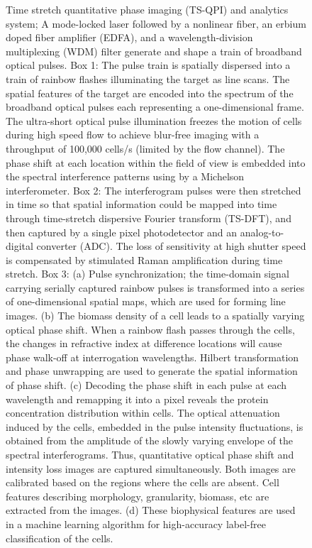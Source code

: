 \documentclass[aps,pra,reprint,superscriptaddress]{revtex4-1}
\begin{document}
\begin{figure}
\caption{\label{fig:Setup} Time stretch quantitative phase imaging (TS-QPI) and analytics system; A mode-locked laser followed by a nonlinear fiber, an erbium doped fiber amplifier (EDFA), and a wavelength-division multiplexing (WDM) filter generate and shape a train of broadband optical pulses. Box 1: The pulse train is spatially dispersed into a train of rainbow flashes illuminating the target as line scans. The spatial features of the target are encoded into the spectrum of the broadband optical pulses each representing a one-dimensional frame. The ultra-short optical pulse illumination freezes the motion of cells during high speed flow to achieve blur-free imaging with a throughput of 100,000 cells/s (limited by the flow channel). The phase shift at each location within the field of view is embedded into the spectral interference patterns using by a Michelson interferometer. Box 2: The interferogram pulses were then stretched in time so that spatial information could be mapped into time through time-stretch dispersive Fourier transform (TS-DFT), and then captured by a single pixel photodetector and an analog-to-digital converter (ADC). The loss of sensitivity at high shutter speed is compensated by stimulated Raman amplification during time stretch. Box 3: (a) Pulse synchronization; the time-domain signal carrying serially captured rainbow pulses is transformed into a series of one-dimensional spatial maps, which are used for forming line images. (b) The biomass density of a cell leads to a spatially varying optical phase shift. When a rainbow flash passes through the cells, the changes in refractive index at difference locations will cause phase walk-off at interrogation wavelengths. Hilbert transformation and phase unwrapping are used to generate the spatial information of phase shift. (c) Decoding the phase shift in each pulse at each wavelength and remapping it into a pixel reveals the protein concentration distribution within cells. The optical attenuation induced by the cells, embedded in the pulse intensity fluctuations, is obtained from the amplitude of the slowly varying envelope of the spectral interferograms. Thus, quantitative optical phase shift and intensity loss images are captured simultaneously. Both images are calibrated based on the regions where the cells are absent. Cell features describing morphology, granularity, biomass, etc are extracted from the images. (d) These biophysical features are used in a machine learning algorithm for high-accuracy label-free classification of the cells.}
\end{figure}
\end{document}
